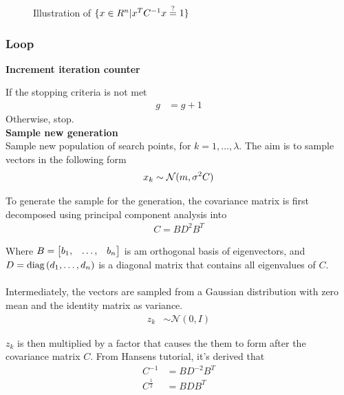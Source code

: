 \begin{figure}[H]
\begin{center}

\end{center}
\begin{center}
\ellipseFigure
\end{center}
\caption{Illustration of $\{x \in R^{n} | x^{T} C^{-1} x \stackrel{?}{=} 1\}$ \label{fig:ellipse}}
\end{figure}

\subsubsection{Loop}

\textbf{Increment iteration counter}

If the stopping criteria is not met
\begin{align}
g &= g+1
\end{align}
Otherwise, stop.\\


\textbf{Sample new generation}\\
Sample new population of search points, for $k = 1, \dots, \lambda$.
The aim is to sample vectors in the following form
\begin{align}
x_{k} \sim \mathcal{N}(m, \sigma^2 C)
\end{align}


To generate the sample for the generation, the covariance matrix is first 
decomposed using principal component analysis into
\begin{align}
C = B D^2 B^{T}
\end{align}

Where $B = \begin{bmatrix}
b_1, & \dots, & b_n
\end{bmatrix}$ 
is am orthogonal basis of eigenvectors, and  
$D = \text{diag}\left(d_1, \dots, d_n\right)$
is a diagonal matrix that contains all eigenvalues of $C$.\\
\\
Intermediately, the vectors are sampled from a Gaussian distribution 
with zero mean and
the identity matrix as variance.
\begin{align}
z_{k} &\sim \mathcal{N}(0, I)
\end{align}

$z_k$ is then multiplied by a factor that causes the them to form 
after the covariance matrix $C$. From Hansens tutorial, it's derived that
\begin{align}
C^{-1} &= B D^{-2} B^{T}\\
C^{\frac{1}{2}} &= B D B^{T}
\end{align}

